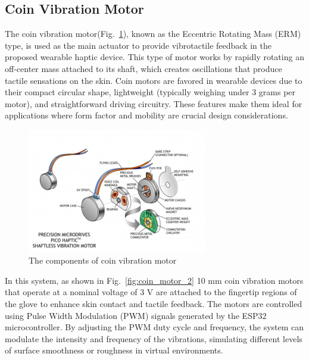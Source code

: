 \newpage
\subsection{Coin Vibration Motor}
The coin vibration motor(Fig.~\ref{fig:coin_motor}), known as the Eccentric Rotating Mass (ERM) type, is used as the main actuator to provide vibrotactile feedback in the proposed wearable haptic device. This type of motor works by rapidly rotating an off-center mass attached to its shaft, which creates oscillations that produce tactile sensations on the skin. Coin motors are favored in wearable devices due to their compact circular shape, lightweight (typically weighing under 3 grams per motor), and straightforward driving circuitry. These features make them ideal for applications where form factor and mobility are crucial design considerations.

\begin{figure}[H]\centering
	\includegraphics[width=0.7\textwidth]{Pictures/coin_motor.jpg}%
	\caption{The components of coin vibration motor~\cite{coin_motor}}\label{fig:coin_motor}%
\end{figure}

In this system, as shown in Fig.~\ref{fig:coin_motor_2} 10 mm coin vibration motors that operate at a nominal voltage of 3 V are attached to the fingertip regions of the glove to enhance skin contact and tactile feedback. The motors are controlled using Pulse Width Modulation (PWM) signals generated by the ESP32 microcontroller. By adjusting the PWM duty cycle and frequency, the system can modulate the intensity and frequency of the vibrations, simulating different levels of surface smoothness or roughness in virtual environments.

